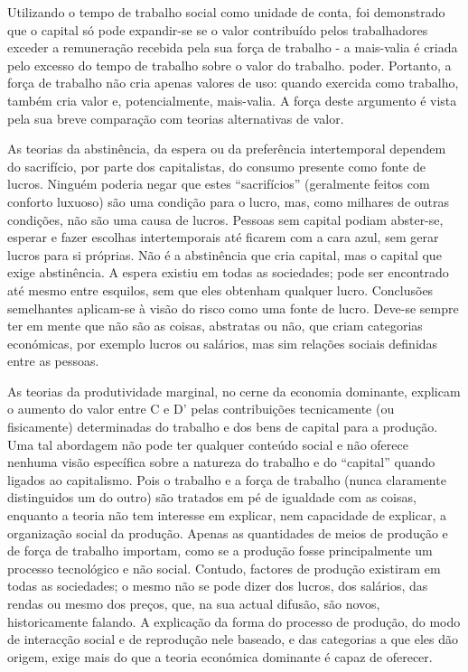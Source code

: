  \par 
Utilizando o tempo de trabalho social como unidade de conta, foi demonstrado que o capital só pode expandir-se se o valor contribuído pelos trabalhadores exceder a remuneração recebida pela sua força de trabalho - a mais-valia é criada pelo excesso do tempo de trabalho sobre o valor do trabalho. poder. Portanto, a força de trabalho não cria apenas valores de uso: quando exercida como trabalho, também cria valor e, potencialmente, mais-valia. A força deste argumento é vista pela sua breve comparação com teorias alternativas de valor.
 \par 
As teorias da abstinência, da espera ou da preferência intertemporal dependem do sacrifício, por parte dos capitalistas, do consumo presente como fonte de lucros. Ninguém poderia negar que estes “sacrifícios” (geralmente feitos com conforto luxuoso) são uma condição para o lucro, mas, como milhares de outras condições, não são uma causa de lucros. Pessoas sem capital podiam abster-se, esperar e fazer escolhas intertemporais até ficarem com a cara azul, sem gerar lucros para si próprias. Não é a abstinência que cria capital, mas o capital que exige abstinência. A espera existiu em todas as sociedades; pode ser encontrado até mesmo entre esquilos, sem que eles obtenham qualquer lucro. Conclusões semelhantes aplicam-se à visão do risco como uma fonte de lucro. Deve-se sempre ter em mente que não são as coisas, abstratas ou não, que criam categorias económicas, por exemplo lucros ou salários, mas sim relações sociais definidas entre as pessoas.
 \par 
As teorias da produtividade marginal, no cerne da economia dominante, explicam o aumento do valor entre C e D' pelas contribuições tecnicamente (ou fisicamente) determinadas do trabalho e dos bens de capital para a produção. Uma tal abordagem não pode ter qualquer conteúdo social e não oferece nenhuma visão específica sobre a natureza do trabalho e do “capital” quando ligados ao capitalismo. Pois o trabalho e a força de trabalho (nunca claramente distinguidos um do outro) são tratados em pé de igualdade com as coisas, enquanto a teoria não tem interesse em explicar, nem capacidade de explicar, a organização social da produção. Apenas as quantidades de meios de produção e de força de trabalho importam, como se a produção fosse principalmente um processo tecnológico e não social. Contudo, factores de produção existiram em todas as sociedades; o mesmo não se pode dizer dos lucros, dos salários, das rendas ou mesmo dos preços, que, na sua actual difusão, são novos, historicamente falando. A explicação da forma do processo de produção, do modo de interacção social e de reprodução nele baseado, e das categorias a que eles dão origem, exige mais do que a teoria económica dominante é capaz de oferecer.
